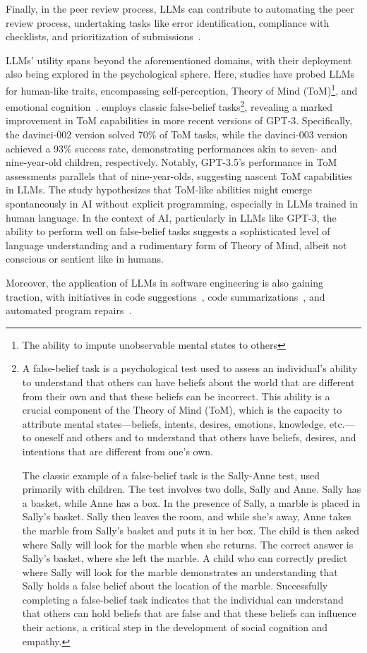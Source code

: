 Finally, in the peer review process, LLMs can contribute to automating the peer review process, undertaking tasks like error identification, compliance with checklists, and prioritization of submissions~\cite{liu2023reviewergpt}.

LLMs' utility spans beyond the aforementioned domains, with their deployment also being explored in the psychological sphere.
Here, studies have probed LLMs for human-like traits, encompassing self-perception, Theory of Mind (ToM)\footnote{The ability to impute unobservable mental states to others}, and emotional cognition~\cite{kosinski2023theoryofmind, amin2023affectivecomputing}.
\textcite{kosinski2023theoryofmind} employs classic false-belief tasks\footnote{A false-belief task is a psychological test used to assess an individual's ability to understand that others can have beliefs about the world that are different from their own and that these beliefs can be incorrect. This ability is a crucial component of the Theory of Mind (ToM), which is the capacity to attribute mental states—beliefs, intents, desires, emotions, knowledge, etc.—to oneself and others and to understand that others have beliefs, desires, and intentions that are different from one's own.

	The classic example of a false-belief task is the Sally-Anne test, used primarily with children. The test involves two dolls, Sally and Anne. Sally has a basket, while Anne has a box. In the presence of Sally, a marble is placed in Sally's basket. Sally then leaves the room, and while she's away, Anne takes the marble from Sally's basket and puts it in her box. The child is then asked where Sally will look for the marble when she returns. The correct answer is Sally's basket, where she left the marble. A child who can correctly predict where Sally will look for the marble demonstrates an understanding that Sally holds a false belief about the location of the marble.
	Successfully completing a false-belief task indicates that the individual can understand that others can hold beliefs that are false and that these beliefs can influence their actions, a critical step in the development of social cognition and empathy.}, revealing a marked improvement in ToM capabilities in more recent versions of GPT-3.
Specifically, the davinci-002 version solved 70\% of ToM tasks, while the davinci-003 version achieved a 93\% success rate, demonstrating performances akin to seven- and nine-year-old children, respectively.
Notably, GPT-3.5's performance in ToM assessments parallels that of nine-year-olds, suggesting nascent ToM capabilities in LLMs.
The study hypothesizes that ToM-like abilities might emerge spontaneously in AI without explicit programming, especially in LLMs trained in human language.
In the context of AI, particularly in LLMs like GPT-3, the ability to perform well on false-belief tasks suggests a sophisticated level of language understanding and a rudimentary form of Theory of Mind, albeit not conscious or sentient like in humans.

Moreover, the application of LLMs in software engineering is also gaining traction, with initiatives in code suggestions~\cite{sridhara2023chatgptsoftware}, code summarizations~\cite{sun2023code}, and automated program repairs~\cite{xia2023conversationalrepair}.